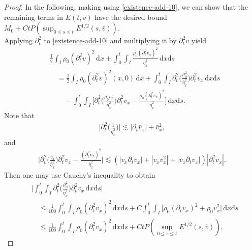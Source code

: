\documentclass[11pt, reqno]{amsart}
\newcommand{\diff}{\mathrm{d}}
\numberwithin{equation}{section}
\begin{document}
{\begin{proof}
\bigskip
In the following, making using \eqref{existence-add-10}, we can show that the remaining terms in \(E(t,v)\) have the desired bound \(M_0+Ct P(\sup_{0\leq s\leq t}E^{1/2}(s,\bar{v}))\).\\
 Applying \(\partial_t^2\) to \eqref{existence-add-10} and multiplying it by \(\partial_t^2v\) yield 
\begin{equation}\label{existence-add-13}
\begin{aligned}
&\frac{1}{2}\int_I \rho_0(\partial_t^2v)^2\,\diff x
+\int_0^t\int_I\frac{\rho_0(\partial_t^2v_x)^2}{\bar{\eta}_x^2}\,\diff x\diff s\\
&\quad=\frac{1}{2}\int_I \rho_0(\partial_t^2v)^2(x,0)\,\diff x+\int_0^t\int_I\partial_t^2\bigg({\frac{\rho_0^2}{\bar{\eta}_x^2}}\bigg)\partial_t^2v_x\,\diff x\diff s\\
&\qquad-\int_0^t\int_I\bigg[\partial_t^2\bigg(\frac{\rho_0v_x}{\bar{\eta}_x^2}\bigg)\partial_t^2v_x
-\frac{\rho_0(\partial_t^2v_x)^2}{\bar{\eta}_x^2}\bigg]\,\diff x\diff s.
\end{aligned}
\end{equation}
Note that
\begin{equation*}
\begin{aligned}
\bigg|\partial_t^2\bigg(\frac{1}{\bar{\eta}_x^2}\bigg)\bigg|\lesssim |\partial_t\bar{v}_x|+\bar{v}_x^2,
\end{aligned}
\end{equation*}
and
\begin{equation*}
\begin{aligned}
\bigg|\partial_t^2\bigg(\frac{v_x}{\bar{\eta}_x^2}\bigg)\partial_t^2v_x
-\frac{(\partial_t^2v_x)^2}{\bar{\eta}_x^2}\bigg|\lesssim (|v_x\partial_t\bar{v}_x|+|v_x\bar{v}_x^2|+|\bar{v}_x\partial_tv_x|)|\partial_t^2v_x|.
\end{aligned}
\end{equation*}
Then one may use Cauchy's inequality to obtain
\begin{equation}\label{existence-add-14}
\begin{aligned}
&\bigg|\int_0^t\int_I\partial_t^2\bigg({\frac{\rho_0^2}{\bar{\eta}_x^2}}\bigg)\partial_t^2v_x\,\diff x\diff s\bigg|\\
&\quad\leq \frac{1}{100}\int_0^t\int_I\rho_0(\partial_t^2v_x)^2\,\diff x\diff s+C\int_0^t\int_I\big[\rho_0(\partial_t\bar{v}_x)^2+\rho_0\bar{v}_x^2\big]\,\diff x\diff s\\
&\quad\leq \frac{1}{100}\int_0^t\int_I\rho_0(\partial_t^2v_x)^2\,\diff x\diff s+Ct P(\sup_{0\leq s\leq t}E^{1/2}(s,\bar{v})),

\end{aligned}
\end{equation}
\end{proof}}
\end{document}
